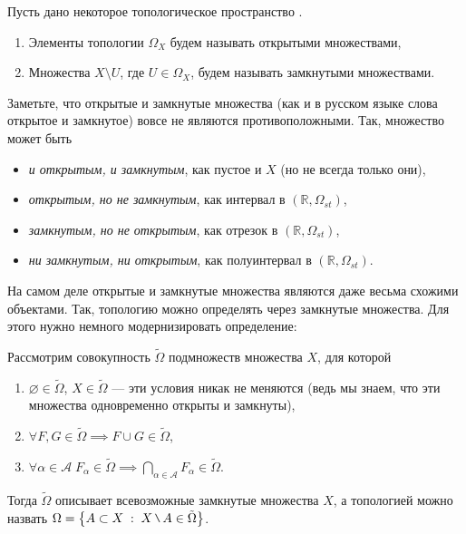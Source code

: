 \begin{Def}
    Пусть дано некоторое топологическое пространство \topX.
    \begin{enumerate}
        \item Элементы топологии $\Omega_X$  будем называть открытыми множествами,
        \item Множества $X\setminus U$, где $U\in \Omega_X$, будем называть замкнутыми множествами.
    \end{enumerate}
\end{Def}
\begin{Note}
   Заметьте, что открытые и замкнутые множества (как и в русском языке слова открытое и замкнутое) вовсе не являются противоположными.
   Так, множество может быть 
   \begin{itemize}
       \item \textit{и открытым, и замкнутым}, как пустое и $X$ (но не всегда только они),
       \item \textit{открытым, но не замкнутым}, как интервал в $(\mathbb{R}, \Omega_{st})$,
       \item \textit{замкнутым, но не открытым}, как отрезок в $(\mathbb{R}, \Omega_{st})$,
       \item \textit{ни замкнутым, ни открытым}, как полуинтервал в $(\mathbb{R}, \Omega_{st})$.
   \end{itemize}
\end{Note}

\begin{Note}
    На самом деле открытые и замкнутые множества являются даже весьма схожими объектами. Так, топологию можно определять через замкнутые множества. Для этого нужно немного модернизировать определение:

    Рассмотрим совокупность $\tilde{\Omega}$ подмножеств множества $X$, для которой 
    \begin{enumerate}
        \item $\varnothing \in \tilde\Omega$, $X \in \tilde\Omega$ --- эти условия никак не меняются (ведь мы знаем, что эти множества одновременно открыты и замкнуты),
        \item $\forall F, G \in \tilde\Omega \implies F \cup G \in \tilde\Omega$,
        \item $\forall \alpha \in \mathcal{A} \; F_\alpha \in \tilde\Omega \implies \bigcap\limits_{\alpha\in\mathcal{A}}F_\alpha \in \tilde\Omega $.
    \end{enumerate}
    Тогда $\tilde\Omega$ описывает всевозможные замкнутые множества $X$, а топологией можно назвать $\Omega = \left\{ A\subset X \st X \setminus A \in \tilde\Omega \right\}$.
\end{Note}

